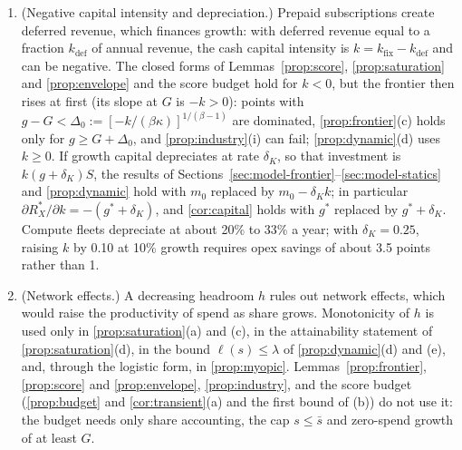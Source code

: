 \begin{remark}
\begin{enumerate}
\item[(c)] (Negative capital intensity and depreciation.) Prepaid subscriptions create deferred revenue, which finances growth: with deferred revenue equal to a fraction $k_{\mathrm{def}}$ of annual revenue, the cash capital intensity is $k=k_{\mathrm{fix}}-k_{\mathrm{def}}$ and can be negative. The closed forms of Lemmas~\ref{prop:score}, \ref{prop:saturation} and \ref{prop:envelope} and the score budget hold for $k<0$, but the frontier then rises at first (its slope at $G$ is $-k>0$): points with $g-G<\Delta_0:=[-k/(\beta\kappa)]^{1/(\beta-1)}$ are dominated, \autoref{prop:frontier}(c) holds only for $g\ge G+\Delta_0$, and \autoref{prop:industry}(i) can fail; \autoref{prop:dynamic}(d) uses $k\ge 0$. If growth capital depreciates at rate $\delta_K$, so that investment is $k(g+\delta_K)S$, the results of Sections~\ref{sec:model-frontier}--\ref{sec:model-statics} and \autoref{prop:dynamic} hold with $m_0$ replaced by $m_0-\delta_Kk$; in particular $\partial R_X^*/\partial k=-(g^*+\delta_K)$, and \autoref{cor:capital} holds with $g^*$ replaced by $g^*+\delta_K$. Compute fleets depreciate at about 20\% to 33\% a year; with $\delta_K=0.25$, raising $k$ by 0.10 at 10\% growth requires opex savings of about 3.5 points rather than 1.
\item[(d)] (Network effects.) A decreasing headroom $h$ rules out network effects, which would raise the productivity of spend as share grows. Monotonicity of $h$ is used only in \autoref{prop:saturation}(a) and (c), in the attainability statement of \autoref{prop:saturation}(d), in the bound $\ell(s)\le\lambda$ of \autoref{prop:dynamic}(d) and (e), and, through the logistic form, in \autoref{prop:myopic}. Lemmas~\ref{prop:frontier}, \ref{prop:score} and \ref{prop:envelope}, \autoref{prop:industry}, and the score budget (\autoref{prop:budget} and \autoref{cor:transient}(a) and the first bound of (b)) do not use it: the budget needs only share accounting, the cap $s\le\bar s$ and zero-spend growth of at least $G$.
\end{enumerate}
\end{remark}

